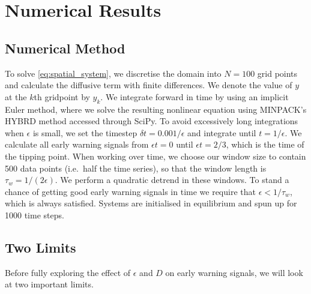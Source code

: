 \section{Numerical Results}
\subsection{Numerical Method}
To solve \cref{eq:spatial_system}, we discretise the domain into $N = 100$ grid
points and 
calculate the diffusive term with finite differences. We denote the value of $y$ at the $k$th gridpoint by $y_k$. We integrate forward in time by 
using an implicit Euler method, where we solve the resulting nonlinear equation using 
MINPACK's HYBRD method accessed through SciPy\cite{Virtanen2020}. To avoid excessively long integrations when $\epsilon$ is small,
we set the timestep $\delta t = 0.001/\epsilon$ and integrate until $t=1/\epsilon$. We
calculate all early warning signals from $\epsilon t=0$ until $\epsilon t=2/3$, which is the 
time of the tipping point. When working over time, we choose our window size to 
contain 500 data points (i.e.\ half the time series),
so that the window length is $\tau_w = 1/(2\epsilon)$. We perform a quadratic detrend in these windows.
To stand a chance of getting good early warning
signals in time we require that $\epsilon < 1/\tau_w$, which is always satisfied.
Systems are initialised in equilibrium and spun up for 1000 time steps.
\subsection{Two Limits}
Before fully exploring the effect of $\epsilon$ and $D$ on early warning signals, we will look at two important limits.    
